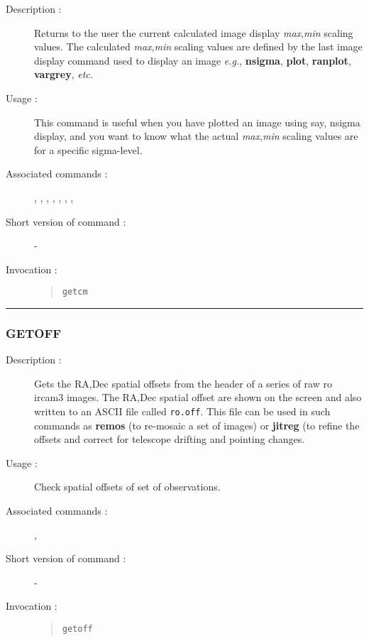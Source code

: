 \begin{description}

\item[Description :] Returns to the user the current calculated image
display {\it max},{\it min} scaling values.  The calculated {\it
max},{\it min} scaling values are defined by the last image display
command used to display an image \emph{e.g.}, {\bf nsigma}, {\bf plot},
{\bf ranplot}, {\bf vargrey}, \emph{etc.}

\item[Usage :] This command is useful when you have plotted an image
using say, nsigma display, and you want to know what the actual {\it
max},{\it min} scaling values are for a specific sigma-level.

\item[Associated commands :] {\tt {}}, 
{\tt {}}, {\tt {}}, 
{\tt {}}, {\tt {}}, 
{\tt {}}, {\tt {}}, \\ 
{\tt {}}

\item[Short version of command :] -
\item[Invocation :]

\begin{quote}{\tt  getcm }\end{quote}

\end{description}

\hrule 
\subsubsection*{\label{GETOFF}GETOFF}

\begin{description}

\item[Description :] Gets the RA,Dec spatial offsets from the header of
a series of raw {\sc ro} {\sc ircam3} images.  The RA,Dec spatial
offset are shown on the screen and also written to an ASCII file called
{\tt ro.off}.  This file can be used in such commands as {\bf remos} (to
re-mosaic a set of images) or {\bf jitreg} (to refine the offsets and correct
for telescope drifting and pointing changes.

\item[Usage :] Check spatial offsets of set of observations.
\item[Associated commands :] {\tt {}}, 
{\tt {}}
\item[Short version of command :] -
\item[Invocation :]

\begin{quote}{\tt  getoff }\end{quote}

\end{description}


